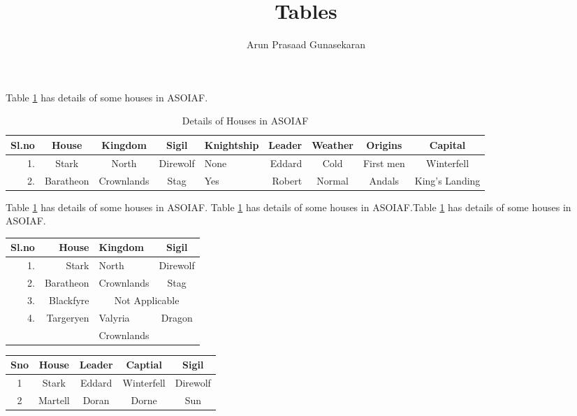\documentclass[10pt,a4paper]{article}
\author{Arun Prasaad Gunasekaran}
\title{Tables}
\begin{document}
\maketitle

Table \ref{Tab1} has details of some houses in ASOIAF.

\begin{table}[h]
\centering
\caption{Details of Houses in ASOIAF}
\label{Tab1}
\begin{tabular}{|r|c|c|c|l|r|c|c|c|}
\hline
Sl.no & House & Kingdom & Sigil & Knightship & Leader & Weather & Origins & Capital \\\hline
1. & Stark & North & Direwolf & None & Eddard & Cold & First men & Winterfell\\\hline \hline
2. & Baratheon & Crownlands & Stag & Yes & Robert & Normal & Andals & King's Landing\\\hline
\end{tabular}
\end{table}

Table \ref{Tab1} has details of some houses in ASOIAF. Table \ref{Tab1} has details of some houses in ASOIAF.Table \ref{Tab1} has details of some houses in ASOIAF.

\begin{table}[h]
\centering
\begin{tabular}{|r|r|l|c|}
\hline
Sl.no & House & Kingdom & Sigil \\\hline
1. & Stark & North & Direwolf \\\hline
2. & Baratheon & Crownlands & Stag \\\hline
3. & Blackfyre & \multicolumn{2}{c|}{Not Applicable}\\\hline
4. & Targeryen & Valyria & Dragon\\
\cline{2-3}
 &  & Crownlands & \\ \hline 

\end{tabular}
\end{table}

\begin{tabular}{|c|c|c|c|c|}
\hline 
Sno & House & Leader & Captial & Sigil \\ 
\hline 
1 & Stark & Eddard & Winterfell & Direwolf \\ 
\hline 
2 & Martell & Doran & Dorne & Sun \\ 
\hline 
\end{tabular} 
\end{document}
